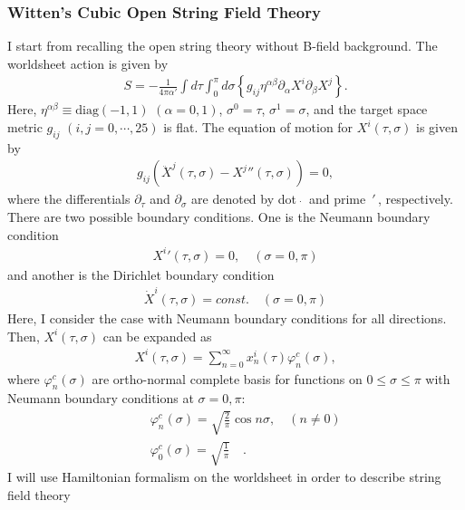 \documentclass[a4paper,12pt]{article}
\newcommand{\nn}{\nonumber\\}
\newcommand{\pa}{\partial}
\newcommand{\co}{\varphi^c}
\begin{document}
\subsubsection*{Witten's Cubic Open String Field Theory}



I start from recalling the open string theory
without B-field background.
The worldsheet action is given by
\begin{eqnarray}
 \label{WS}
S=
-\frac{1}{4\pi\alpha'}
\int d\tau \int_0^{\pi} d\sigma
\left\{
g_{ij} \eta^{\alpha\beta} \pa_\alpha X^i \pa_\beta X^j
\right\} .
\end{eqnarray}
Here, 
$\eta^{\alpha\beta} \equiv \mbox{diag}(-1,1)\,\, 
(\alpha = 0,1)$,
$\sigma^0=\tau$,  $\sigma^1=\sigma$, and
the target space metric 
$g_{ij}\,\, (i,j = 0,\cdots, 25)$ is flat.
The equation of motion for $X^i(\tau,\sigma)$
is given by
\begin{eqnarray}
g_{ij}
\left(
\ddot{X}^j(\tau,\sigma) - {X^j}''(\tau,\sigma) 
\right) = 0,
\end{eqnarray}
where the differentials $\pa_\tau$ and $\pa_\sigma$
are denoted by dot $\dot{\,\,}$ and prime $\,'\,$, respectively.
There are
two possible boundary conditions.
One is the
Neumann boundary condition
\begin{eqnarray}
 \label{Nbc}
{X^i}'(\tau,\sigma) = 0, \quad (\sigma = 0, \pi)
\end{eqnarray}
and another is the 
Dirichlet boundary condition
\begin{eqnarray}
 \label{Dbc}
\dot{X}^i(\tau,\sigma) = const. \quad (\sigma = 0, \pi)
\end{eqnarray}
Here, I consider the case  
with Neumann boundary conditions
for all directions.
Then, $X^i(\tau,\sigma)$ can be expanded as
\begin{eqnarray}
 \label{Xtsmod}
X^i(\tau,\sigma) =
\sum_{n=0}^{\infty}
x^i_n(\tau) \co_n(\sigma),
\end{eqnarray}
where $\co_n(\sigma)$ are ortho-normal complete basis for
functions on $0\le \sigma \le \pi$
with Neumann boundary conditions at $\sigma = 0,\pi$:
\begin{eqnarray}
 \label{defco}
&&\co_n(\sigma) = \sqrt{\frac{2}{\pi}} \cos n \sigma,
 \quad (n \ne 0) \nn
&&\co_0(\sigma) = \sqrt{\frac{1}{\pi}} \quad.
\end{eqnarray}
I will use Hamiltonian formalism on the worldsheet
in order to describe string field theory
\end{document}
